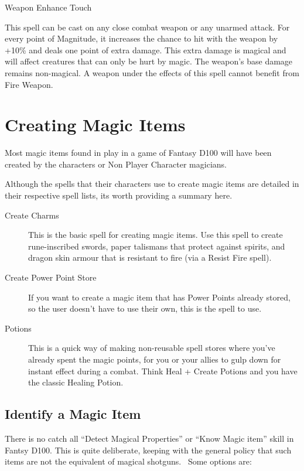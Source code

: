 \begin{rpg-spell}
{Weapon Enhance}
{Touch}

This spell can be cast on any close combat weapon or any unarmed attack. For every point of Magnitude, it increases the chance to hit with the weapon by +10\% and deals one point of extra damage. This extra damage is magical and will affect creatures that can only be hurt by magic. The weapon’s base damage remains non-magical. A weapon under the effects of this spell cannot benefit from Fire Weapon.
\end{rpg-spell}


\section{Creating Magic Items}

Most magic items found in play in a game of Fantasy D100 will have been created by the characters or Non Player Character magicians.

Although the spells that their characters use to create magic items are detailed in their respective spell lists, its worth providing a summary here.

\begin{description}
\item [Create Charms] This is the basic spell for creating magic items. Use this spell to create rune-inscribed swords, paper talismans that protect against spirits, and dragon skin armour that is resistant to fire (via a Resist Fire spell).
\item [Create Power Point Store] If you want to create a magic item that has Power Points already stored, so the user doesn’t have to use their own, this is the spell to use.
\item [Potions] This is a quick way of making non-reusable spell stores where you’ve already spent the magic points, for you or your allies to gulp down for instant effect during a combat. Think Heal + Create Potions and you have the classic Healing Potion.
\end{description}

\subsection{Identify a Magic Item}
There is no catch all “Detect Magical Properties” or “Know Magic item” skill in Fantsy D100. This is quite deliberate, keeping with the general policy that such items are not the equivalent of magical shotguns.  Some options are:

